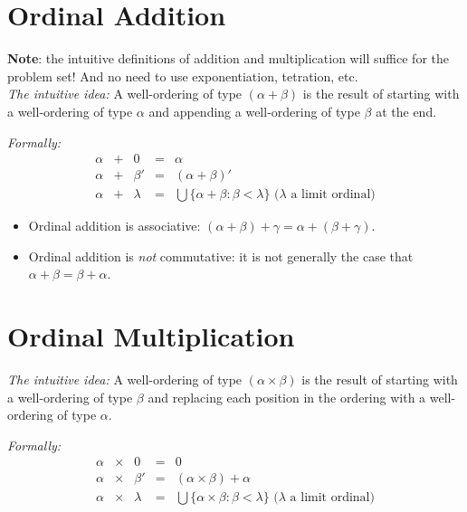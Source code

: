 \documentclass[12pt]{extarticle}
\begin{document}
\section{Ordinal Addition}

\textbf{Note}: the intuitive definitions of addition and multiplication will suffice for the problem set! And no need to use exponentiation, tetration, etc. \\[1ex]

\noindent \emph{The intuitive idea:} A well-ordering of type $(\alpha+\beta)$ is the result of starting with a well-ordering of type $\alpha$ and appending a well-ordering of type $\beta$ at the end.

\vspace{2mm}
\noindent
\emph{Formally:}
\vspace{-4mm}
\[
\begin{array}{rclcl}
 \alpha &+ &0 &= &\alpha  \\
 \alpha &+ &\beta' &= &(\alpha + \beta)'\\
 \alpha &+ &\lambda &= & \bigcup \{\alpha + \beta : \beta < \lambda\} \text{ ($\lambda$ a limit ordinal)}
  \end{array}
 \]


\begin{itemize}
\item Ordinal addition is associative: \((\alpha+\beta)+\gamma = \alpha+(\beta+\gamma)\).

\item Ordinal addition is \emph{not} commutative: it is not generally the case that $\alpha + \beta = \beta + \alpha$.
\end{itemize}

\section{Ordinal Multiplication}

\emph{The intuitive idea:} A well-ordering of type $(\alpha\times\beta)$ is the result of starting with a well-ordering of type $\beta$ and replacing each position in the ordering with a well-ordering of type $\alpha$.

\vspace{3mm}

\noindent
\emph{Formally:}
\vspace{-3mm}
\[
\begin{array}{rclcl}
  \alpha &\times &0 &= &0  \\
 \alpha &\times &\beta' &= &(\alpha \times \beta) + \alpha\\
 \alpha &\times &\lambda &= & \bigcup \{\alpha \times \beta : \beta < \lambda\} \text{ ($\lambda$ a limit ordinal)}
 \end{array}
\]
\end{document}

